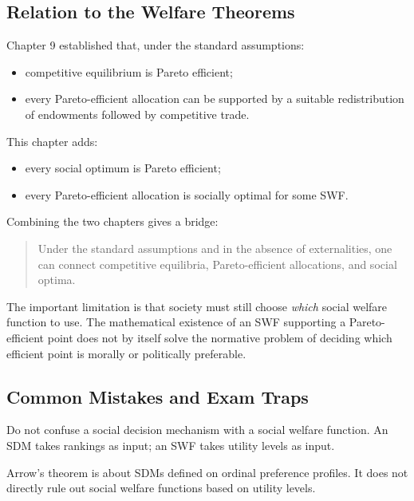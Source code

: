 \subsection{Relation to the Welfare Theorems}

Chapter 9 established that, under the standard assumptions:
\begin{itemize}
    \item competitive equilibrium is Pareto efficient;
    \item every Pareto-efficient allocation can be supported by a suitable redistribution of endowments followed by competitive trade.
\end{itemize}

This chapter adds:
\begin{itemize}
    \item every social optimum is Pareto efficient;
    \item every Pareto-efficient allocation is socially optimal for some SWF.
\end{itemize}

Combining the two chapters gives a bridge:
\begin{quote}
Under the standard assumptions and in the absence of externalities, one can connect competitive equilibria, Pareto-efficient allocations, and social optima.
\end{quote}

\begin{policynote}
The important limitation is that society must still choose \emph{which} social welfare function to use. The mathematical existence of an SWF supporting a Pareto-efficient point does not by itself solve the normative problem of deciding which efficient point is morally or politically preferable.
\end{policynote}

\subsection{Common Mistakes and Exam Traps}

\begin{commonmistake}
Do not confuse a social decision mechanism with a social welfare function. An SDM takes rankings as input; an SWF takes utility levels as input.
\end{commonmistake}

\begin{commonmistake}
Arrow's theorem is about SDMs defined on ordinal preference profiles. It does not directly rule out social welfare functions based on utility levels.
\end{commonmistake}

